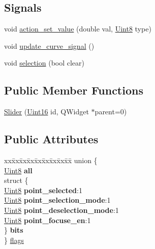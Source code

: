 \subsection*{Signals}
\begin{DoxyCompactItemize}
\item 
void \hyperlink{a00077_a886f07f2c612121bec703581f9398a10}{action\+\_\+set\+\_\+value} (double val, \hyperlink{a00004_a979e3e23b9a449e69ab6a8a83b6042f8}{Uint8} type)
\item 
void \hyperlink{a00077_a49696761b5c638a3b2d58b16af9773e0}{update\+\_\+curve\+\_\+signal} ()
\item 
void \hyperlink{a00077_a66bf875d43a16cf37527ab75c439fd8e}{selection} (bool clear)
\end{DoxyCompactItemize}
\subsection*{Public Member Functions}
\begin{DoxyCompactItemize}
\item 
\hyperlink{a00077_a4f5bd678ed7e386b568121eaeb0ce912}{Slider} (\hyperlink{a00004_aae7407b021d43f7193a81a58cfb3e297}{Uint16} id, Q\+Widget $\ast$parent=0)
\end{DoxyCompactItemize}
\subsection*{Public Attributes}
\begin{DoxyCompactItemize}
\item 
\begin{tabbing}
xx\=xx\=xx\=xx\=xx\=xx\=xx\=xx\=xx\=\kill
union \{\\
\hyperlink{a00004_a979e3e23b9a449e69ab6a8a83b6042f8}{Uint8} {\bfseries all}\\
\>struct \{\\
\hyperlink{a00004_a979e3e23b9a449e69ab6a8a83b6042f8}{Uint8} {\bfseries point\_selected}:1\\
\hyperlink{a00004_a979e3e23b9a449e69ab6a8a83b6042f8}{Uint8} {\bfseries point\_selection\_mode}:1\\
\hyperlink{a00004_a979e3e23b9a449e69ab6a8a83b6042f8}{Uint8} {\bfseries point\_deselection\_mode}:1\\
\hyperlink{a00004_a979e3e23b9a449e69ab6a8a83b6042f8}{Uint8} {\bfseries point\_focuse\_en}:1\\
\>\} {\bfseries bits}\\
\} \hyperlink{a00077_ade6449558d429b66e5ed1381bc9b9060}{flags}\\

\end{tabbing}\end{DoxyCompactItemize}
